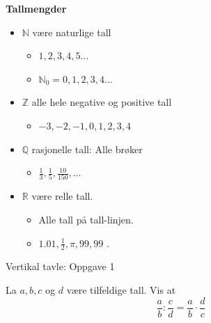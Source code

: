 \documentclass[aspectratio=119,12pt]{beamer}
\begin{document}
\begin{frame}
    \centering
     \textbf{Tallmengder}

     \begin{itemize}
         \item $ \mathbb{N} $ være naturlige tall 
             \begin{itemize}
                 \item $1,2,3,4,5 \ldots$
                 \item $\mathbb{N}_0 = 0,1,2,3,4 \ldots $
             \end{itemize}
         \item $ \mathbb{Z} $ alle hele negative og positive tall 
             \begin{itemize}
                 \item $-3,-2,-1,0,1,2,3,4$
             \end{itemize}
                 
         \item $ \mathbb{Q}  $ rasjonelle tall: Alle brøker 
             \begin{itemize}
                 \item  $\frac{1}{3} , \frac{1}{5}, \frac{10}{150} , \ldots$ 
             \end{itemize}

         \item $ \mathbb{R} $ være relle tall. 
             \begin{itemize}
                 \item Alle tall på tall-linjen. 
                 \item $1.01, \frac{1}{2} , \pi, 99,99 $ . 
             \end{itemize}
     \end{itemize}




\end{frame}

\begin{frame}{Vertikal tavle: Oppgave 1}

    La $a,b,c$ og $d$ være tilfeldige tall. Vis at \begin{equation}
 \frac{a}{b} :  \frac{c}{d} = \frac{a}{b} \cdot \frac{d}{c}         
    \end{equation}  

\end{frame}
\end{document}
